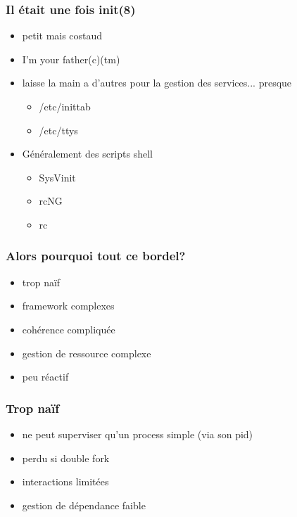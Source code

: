 \begin{frame}
	\frametitle{Il était une fois init(8)}
	\begin{itemize}
		\item petit mais costaud
			\pause
		\item I'm your father(c)(tm)
			\pause
		\item laisse la main a d'autres pour la gestion des services... \pause presque
			\pause
			\begin{itemize}
				\item /etc/inittab
				\item /etc/ttys
			\end{itemize}
			\pause
		\item Généralement des scripts shell
			\begin{itemize}
				\item SysVinit
				\item rcNG
				\item rc
			\end{itemize}
	\end{itemize}
\end{frame}

\begin{frame}
	\frametitle{Alors pourquoi tout ce bordel?}
	\begin{itemize}
			\pause
		\item trop naïf
			\pause
		\item framework complexes
			\pause
		\item cohérence compliquée
			\pause
		\item gestion de ressource complexe
			\pause
		\item peu réactif
	\end{itemize}
\end{frame}

\begin{frame}
	\frametitle{Trop naïf}
	\begin{itemize}
			\pause
		\item ne peut superviser qu'un process simple (via son pid)
			\pause
		\item perdu si double fork
			\pause
		\item interactions limitées
			\pause
		\item gestion de dépendance faible
	\end{itemize}
\end{frame}

